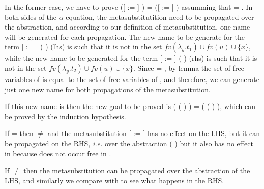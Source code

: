 \begin{coqdoccode}
\end{coqdoccode}
In the former case, we have to prove  ([ := ]   ) = ([ := ]   ) assumming that  = . In both sides of the $\alpha$-equation, the metasubstitutition need to be propagated over the abstraction, and according to our definition of metasubstitution, one name will be generated for each propagation. The new name to be generate for the term [ := ] (  ) (lhs) is such that it is not in the set $fv(\lambda_y.t_1)\cup fv(u) \cup \{x\}$, while the new name to be generated for the term [ := ] (  ) (rhs) is such that it is not in the set $fv(\lambda_y.t_2)\cup fv(u) \cup \{x\}$. Since  = , by lemma  the set of free variables of  is equal to the set of free variables of , and therefore, we can generate just one new name for both propagations of the metasubstitution. 
\begin{coqdoccode}
\end{coqdoccode}
If this new name is  then the new goal to be proved is   ( (   )  ) =   ( (   )  ), which can be proved by the induction hypothesis. 
\begin{coqdoccode}
\end{coqdoccode}
If  =  then  \ensuremath{\not=}  and the metasubstitution [ := ] has no effect on the LHS, but it can be propagated on the RHS, {\it i.e.} over the abstraction (  ) but it also has no effect in  because  does not occur free in . 
\begin{coqdoccode}
\end{coqdoccode}
If  \ensuremath{\not=}  then the metasubstitution can be propagated over the abstraction of the LHS, and similarly we compare  with  to see what happens in the RHS. 
